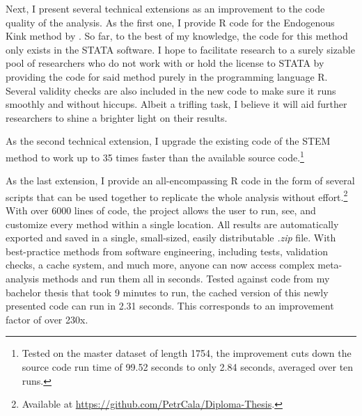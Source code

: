 Next, I present several technical extensions as an improvement to the code quality of the analysis. As the first one, I provide R code for the Endogenous Kink method by \citep{Bom2019Kink}. So far, to the best of my knowledge, the code for this method only exists in the STATA software. I hope to facilitate research to a surely sizable pool of researchers who do not work with or hold the license to STATA by providing the code for said method purely in the programming language R. Several validity checks are also included in the new code to make sure it runs smoothly and without hiccups. Albeit a trifling task, I believe it will aid further researchers to shine a brighter light on their results.

As the second technical extension, I upgrade the existing code of the STEM method \citep{Furukawa2019Stem} to work up to 35 times faster than the available source code.\footnote{Tested on the master dataset of length 1754, the improvement cuts down the source code run time of 99.52 seconds to only 2.84 seconds, averaged over ten runs.}

As the last extension, I provide an all-encompassing R code in the form of several scripts that can be used together to replicate the whole analysis without effort.\footnote{Available at \href{https://github.com/PetrCala/Diploma-Thesis}{https://github.com/PetrCala/Diploma-Thesis}.} With over 6000 lines of code, the project allows the user to run, see, and customize every method within a single location. All results are automatically exported and saved in a single, small-sized, easily distributable \textit{.zip} file. With best-practice methods from software engineering, including tests, validation checks, a cache system, and much more, anyone can now access complex meta-analysis methods and run them all in seconds. Tested against code from my bachelor thesis that took 9 minutes to run, the cached version of this newly presented code can run in 2.31 seconds. This corresponds to an improvement factor of over 230x.